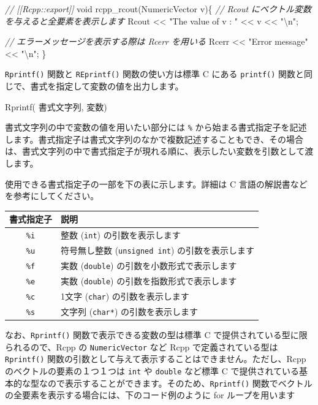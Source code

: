 \documentclass[]{book}
\newenvironment{Shaded}{\begin{snugshade}}{\end{snugshade}}
\newcommand{\CommentTok}[1]{\textcolor[rgb]{0.56,0.35,0.01}{\textit{#1}}}
\newcommand{\DataTypeTok}[1]{\textcolor[rgb]{0.13,0.29,0.53}{#1}}
\newcommand{\NormalTok}[1]{#1}
\newcommand{\SpecialCharTok}[1]{\textcolor[rgb]{0.00,0.00,0.00}{#1}}
\newcommand{\StringTok}[1]{\textcolor[rgb]{0.31,0.60,0.02}{#1}}
\begin{document}
\begin{Shaded}
\begin{Highlighting}[]
\CommentTok{// [[Rcpp::export]]}
\DataTypeTok{void}\NormalTok{ rcpp_rcout(NumericVector v)\{}
  \CommentTok{// Rcout にベクトル変数を与えると全要素を表示します}
\NormalTok{  Rcout << }\StringTok{"The value of v : "}\NormalTok{ << v << }\StringTok{"}\SpecialCharTok{\textbackslash{}n}\StringTok{"}\NormalTok{;}

  \CommentTok{// エラーメッセージを表示する際は Rcerr を用いる}
\NormalTok{  Rcerr << }\StringTok{"Error message"}\NormalTok{ << }\StringTok{"}\SpecialCharTok{\textbackslash{}n}\StringTok{"}\NormalTok{;}
\NormalTok{\}}
\end{Highlighting}
\end{Shaded}

\texttt{Rprintf()} 関数と \texttt{REprintf()} 関数の使い方は標準 C にある \texttt{printf()} 関数と同じで、書式を指定して変数の値を出力します。

\begin{Shaded}
\begin{Highlighting}[]
\NormalTok{Rprintf( 書式文字列, 変数)}
\end{Highlighting}
\end{Shaded}

書式文字列の中で変数の値を用いたい部分には \texttt{\%} から始まる書式指定子を記述します。書式指定子は書式文字列のなかで複数記述することもでき、その場合は、書式文字列の中で書式指定子が現れる順に、表示したい変数を引数として渡します。

使用できる書式指定子の一部を下の表に示します。詳細は C 言語の解説書などを参考にしてください。

\begin{longtable}[]{@{}cl@{}}
\toprule
書式指定子 & 説明\tabularnewline
\midrule
\endhead
\texttt{\%i} & 整数 (\texttt{int}) の引数を表示します\tabularnewline
\texttt{\%u} & 符号無し整数 (\texttt{unsigned\ int}) の引数を表示します\tabularnewline
\texttt{\%f} & 実数 (\texttt{double}) の引数を小数形式で表示します\tabularnewline
\texttt{\%e} & 実数 (\texttt{double}) の引数を指数形式で表示します\tabularnewline
\texttt{\%c} & 1文字 (\texttt{char}) の引数を表示します\tabularnewline
\texttt{\%s} & 文字列 (\texttt{char*}) の引数を表示します\tabularnewline
\bottomrule
\end{longtable}

なお、\texttt{Rprintf()} 関数で表示できる変数の型は標準 C で提供されている型に限られるので、Rcpp の \texttt{NumericVector} など Rcpp で定義されている型は \texttt{Rprintf()} 関数の引数として与えて表示することはできません。ただし、Rcpp のベクトルの要素の１つ１つは \texttt{int} や \texttt{double} など標準 C で提供されている基本的な型なので表示することができます。そのため、\texttt{Rprintf()} 関数でベクトルの全要素を表示する場合には、下のコード例のように for ループを用います
\end{document}
